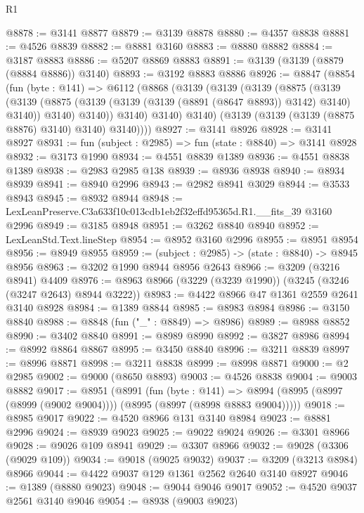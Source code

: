 \begin{lexlean}{R1}
\begin{coremodule}
@8878 := @3141 @8877
@8879 := @3139 @8878
@8880 := @4357 @8838
@8881 := @4526 @8839
@8882 := @8881 @3160
@8883 := @8880 @8882
@8884 := @3187 @8883
@8886 := @5207 @8869 @8883
@8891 := @3139 (@3139 (@8879 (@8884 @8886)) @3140)
@8893 := @3192 @8883 @8886
@8926 := @8847
    (@8854
      (fun (byte : @141) =>
      @6112
        (@8868
          (@3139
            (@3139
              (@3139
                (@8875
                  (@3139
                    (@3139
                      (@8875 (@3139 (@3139 (@3139 (@8891 (@8647 @8893)) @3142) @3140) @3140))
                      @3140)
                    @3140))
                @3140)
              @3140)
            @3140)
          (@3139 (@3139 (@3139 (@8875 @8876) @3140) @3140) @3140))))
@8927 := @3141 @8926
@8928 := @3141 @8927
@8931 := fun (subject : @2985) => fun (state : @8840) => @3141 @8928
@8932 := @3173 @1990
@8934 := @4551 @8839 @1389
@8936 := @4551 @8838 @1389
@8938 := @2983 @2985 @138
@8939 := @8936 @8938
@8940 := @8934 @8939
@8941 := @8940 @2996
@8943 := @2982 @8941 @3029
@8944 := @3533 @8943
@8945 := @8932 @8944
@8948 := LexLeanPreserve.C3a633f10c013cdb1eb2f32effd95365d.R1.__fits_39 @3160 @2996
@8949 := @3185 @8948
@8951 := @3262 @8840 @8940
@8952 := LexLeanStd.Text.lineStep
@8954 := @8952 @3160 @2996
@8955 := @8951 @8954
@8956 := @8949 @8955
@8959 := (subject : @2985) -> (state : @8840) -> @8945 @8956
@8963 := @3202 @1990 @8944 @8956 @2643
@8966 := @3209 (@3216 @8941) @4409
@8976 := @8963 @8966 (@3229 (@3239 @1990)) (@3245 (@3246 (@3247 @2643) @8944 @3222))
@8983 := @4422 @8966 @47 @1361 @2559 @2641 @3140 @8928
@8984 := @1389 @8844
@8985 := @8983 @8984
@8986 := @3150 @8840
@8988 := @8848 (fun ("_" : @8849) => @8986)
@8989 := @8988 @8852
@8990 := @3402 @8840
@8991 := @8989 @8990
@8992 := @3827 @8986
@8994 := @8992 @8864 @8867
@8995 := @3450 @8840
@8996 := @3211 @8839
@8997 := @8996 @8871
@8998 := @3211 @8838
@8999 := @8998 @8871
@9000 := @2 @2985
@9002 := @9000 (@8650 @8893)
@9003 := @4526 @8838
@9004 := @9003 @8882
@9017 := @8951
    (@8991
      (fun (byte : @141) =>
      @8994 (@8995 (@8997 (@8999 (@9002 @9004)))) (@8995 (@8997 (@8998 @8883 @9004)))))
@9018 := @8985 @9017
@9022 := @4520 @8966 @131 @3140 @8984
@9023 := @8881 @2996
@9024 := @8939 @9023
@9025 := @9022 @9024
@9026 := @3301 @8966
@9028 := @9026 @109 @8941
@9029 := @3307 @8966
@9032 := @9028 (@3306 (@9029 @109))
@9034 := @9018 (@9025 @9032)
@9037 := @3209 (@3213 @8984) @8966
@9044 := @4422 @9037 @129 @1361 @2562 @2640 @3140 @8927
@9046 := @1389 (@8880 @9023)
@9048 := @9044 @9046 @9017
@9052 := @4520 @9037 @2561 @3140 @9046
@9054 := @8938 (@9003 @9023)

\end{coremodule}
\end{lexlean}
